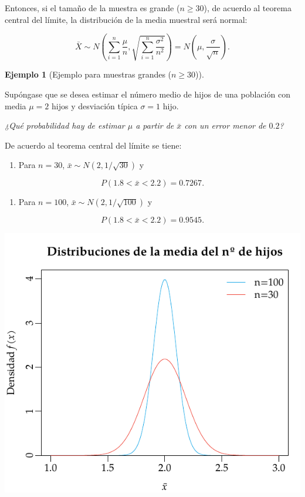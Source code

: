 \documentclass[
  a4paper,
]{scrreport}
\providecommand{\tightlist}{%
  \setlength{\itemsep}{0pt}\setlength{\parskip}{0pt}}\usepackage{longtable,booktabs,array}
\theoremstyle{plain}
\theoremstyle{definition}
\newtheorem{example}{Ejemplo}[chapter]
\theoremstyle{definition}
\theoremstyle{remark}
\begin{document}
Entonces, si el tamaño de la muestra es grande (\(n\geq 30\)), de
acuerdo al teorema central del límite, la distribución de la media
muestral será normal:

\[
\bar X \sim N\left(\sum_{i=1}^n \frac{\mu}{n},\sqrt{\sum_{i=1}^n \frac{\sigma^2}{n^2}} \right) = N\left(\mu,\frac{\sigma}{\sqrt{n}} \right).
\]

\begin{example}[Ejemplo para muestras grandes
(\(n\geq 30\))]\protect\hypertarget{exm-distribucion-media-muestras-grandes}{}\label{exm-distribucion-media-muestras-grandes}

Supóngase que se desea estimar el número medio de hijos de una población
con media \(\mu=2\) hijos y desviación típica \(\sigma=1\) hijo.

\emph{¿Qué probabilidad hay de estimar \(\mu\) a partir de \(\bar x\)
con un error menor de \(0.2\)?}

De acuerdo al teorema central del límite se tiene:

\begin{enumerate}
\def\labelenumi{\arabic{enumi}.}
\tightlist
\item
  Para \(n=30\), \(\bar x\sim N(2,1/\sqrt{30})\) y
\end{enumerate}

\[
P(1.8<\bar x<2.2) = 0.7267.
\]

\begin{enumerate}
\def\labelenumi{\arabic{enumi}.}
\tightlist
\item
  Para \(n=100\), \(\bar x\sim N(2,1/\sqrt{100})\) y
\end{enumerate}

\[
P(1.8<\bar x<2.2) = 0.9545.
\]

\begin{center}
\includegraphics{img/estimacion/teorema-central-limite.pdf}
\end{center}

\end{example}
\end{document}
